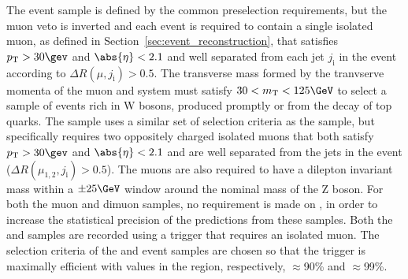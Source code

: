 The \mj event sample is defined by the common preselection
requirements, but the muon veto is inverted and each event is required
to contain a single isolated muon, as defined in
Section~\ref{sec:event_reconstruction}, that satisfies $\Pt > 30\gev$
and $\abs{\eta} < 2.1$ and well separated from each jet $j_{\text{i}}$
in the event according to $\Delta R(\mu,j_{\text{i}}) > 0.5$.
The transverse mass formed by the tranvserve momenta of the muon and
\ptvecmiss system must satisfy $30 < m_\text{T} < 125\GeV$ to select a
sample of events rich in W bosons, produced promptly or from the decay
of top quarks. The \mmj sample uses a similar set of selection
criteria as the \mj sample, but specifically requires two oppositely
charged isolated muons that both satisfy $\Pt > 30\gev$ and
$\abs{\eta} < 2.1$ and are well separated from the jets in the event
($\Delta R(\mu_{1,2},j_{\text{i}}) > 0.5$). The muons are also
required to have a dilepton invariant mass within a $\pm 25\GeV$
window around the nominal mass of the Z boson. For both the muon and
dimuon samples, no requirement is made on \alphat, in order to
increase the statistical precision of the predictions from these
samples. Both the \mj and \mmj samples are recorded using a trigger
that requires an isolated muon. The selection criteria of the \mj and
\mmj event samples are chosen so that the trigger is maximally
efficient with values in the region, respectively, $\approx$90\% and
$\approx$99\%.

